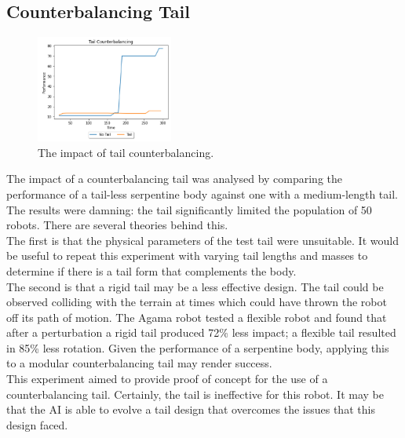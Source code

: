 \documentclass{article}
\begin{document}
\subsection{Counterbalancing Tail}
\label{sec:Tail Res}
\begin{figure}
    \centering
    \vspace*{-5mm}
    \includegraphics[width=0.4\textwidth]{tailResults}
    \vspace*{-7mm}
    \caption{The impact of tail counterbalancing.}
\end{figure}
The impact of a counterbalancing tail was analysed by comparing the performance of a tail-less serpentine body against one with a medium-length tail. The results were damning: the tail significantly limited the population of 50 robots. There are several theories behind this.\\
The first is that the physical parameters of the test tail were unsuitable. It would be useful to repeat this experiment with varying tail lengths and masses to determine if there is a tail form that complements the body. \\
The second is that a rigid tail may be a less effective design. The tail could be observed colliding with the terrain at times which could have thrown the robot off its path of motion. The Agama robot tested a flexible robot and found that after a perturbation a rigid tail produced 72\% less impact; a flexible tail resulted in 85\% less rotation.  Given the performance of a serpentine body, applying this to a modular counterbalancing tail may render success. \\

This experiment aimed to provide proof of concept for the use of a counterbalancing tail. Certainly, the tail is ineffective for this robot. It may be that the AI is able to evolve a tail design that overcomes the issues that this design faced. 

\newpage
\end{document}
